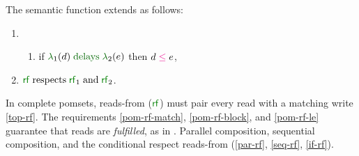 \begin{definition}
  \noindent
  \begin{minipage}{1.0\linewidth}
    The semantic function extends  as follows:
    \begin{multicols}{2}
      \begin{enumerate}[topsep=0pt,label=(\textsc{i}\arabic*),ref=\textsc{s}\arabic*]
        \setcounter{enumi}{\value{le}}
      \item[]
        \begin{enumerate}[leftmargin=0pt]
        \item \label{seq-le-delays}
          if $\labeling_1(\bEv) \rdelays \labeling_2(\aEv)$ then $\bEv\le\aEv$,
        \end{enumerate}
      \item[{\labeltext[\textsc{p}7]{(\textsc{p}7)}{par-rf}}]
        \;
        \;
        ${\rrfx}\rextends{\rrfx_1}{\rrfx_2}$.
      \end{enumerate}  
    \end{multicols}
  \end{minipage}
  \smallskip
\end{definition}

In complete pomsets, reads-from ($\rrfx$) must pair every read with a
matching write \eqref{top-rf}.  The requirements \ref{pom-rf-match},
\ref{pom-rf-block}, and \ref{pom-rf-le} guarantee that reads are
\emph{fulfilled}, as in \cite[]{DBLP:journals/pacmpl/JagadeesanJR20}.  Parallel composition, sequential
composition, and the conditional respect reads-from (\ref{par-rf},
\ref{seq-rf}, \ref{if-rf}).


